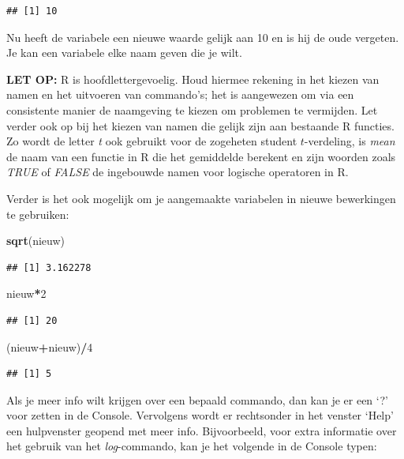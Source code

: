 \documentclass[
]{book}
\newenvironment{Shaded}{\begin{snugshade}}{\end{snugshade}}
\newcommand{\DecValTok}[1]{\textcolor[rgb]{0.00,0.00,0.81}{#1}}
\newcommand{\FunctionTok}[1]{\textcolor[rgb]{0.13,0.29,0.53}{\textbf{#1}}}
\newcommand{\NormalTok}[1]{#1}
\newcommand{\SpecialCharTok}[1]{\textcolor[rgb]{0.81,0.36,0.00}{\textbf{#1}}}
\begin{document}
\begin{verbatim}
## [1] 10
\end{verbatim}

Nu heeft de variabele een nieuwe waarde gelijk aan 10 en is hij de oude vergeten. Je kan een variabele elke naam geven die je wilt.

\textbf{LET OP:} R is hoofdlettergevoelig. Houd hiermee rekening in het kiezen van namen en het uitvoeren
van commando's; het is aangewezen om via een consistente manier de naamgeving te kiezen om problemen te vermijden.
Let verder ook op bij het kiezen van namen die gelijk zijn aan bestaande R functies. Zo wordt de letter \emph{t} ook gebruikt voor de zogeheten student \(t\)-verdeling, is \emph{mean} de naam van een functie in R die het gemiddelde berekent en zijn woorden zoals \emph{TRUE} of \emph{FALSE} de ingebouwde namen voor logische operatoren in R.

Verder is het ook mogelijk om je aangemaakte variabelen in nieuwe bewerkingen te gebruiken:

\begin{Shaded}
\begin{Highlighting}[]
\FunctionTok{sqrt}\NormalTok{(nieuw)}
\end{Highlighting}
\end{Shaded}

\begin{verbatim}
## [1] 3.162278
\end{verbatim}

\begin{Shaded}
\begin{Highlighting}[]
\NormalTok{nieuw}\SpecialCharTok{*}\DecValTok{2}
\end{Highlighting}
\end{Shaded}

\begin{verbatim}
## [1] 20
\end{verbatim}

\begin{Shaded}
\begin{Highlighting}[]
\NormalTok{(nieuw}\SpecialCharTok{+}\NormalTok{nieuw)}\SpecialCharTok{/}\DecValTok{4}
\end{Highlighting}
\end{Shaded}

\begin{verbatim}
## [1] 5
\end{verbatim}

Als je meer info wilt krijgen over een bepaald commando, dan kan je er een `?' voor zetten
in de Console. Vervolgens wordt er rechtsonder in het venster `Help' een hulpvenster geopend met meer info. Bijvoorbeeld, voor extra informatie over het gebruik van het \emph{log}-commando, kan je het volgende in de Console typen:
\end{document}
